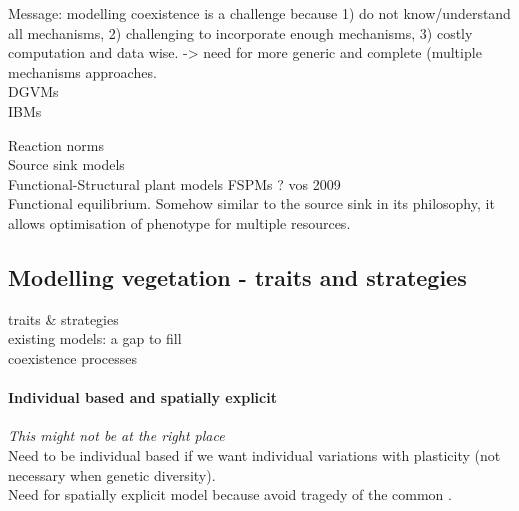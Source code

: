 Message: modelling coexistence is a challenge because 1) do not know/understand all mechanisms, 2) challenging to incorporate enough mechanisms, 3) costly computation and data wise. -> need for more generic and complete (multiple mechanisms approaches.\\

DGVMs\\
IBMs

Reaction norms\\
Source sink models\\
Functional-Structural plant models FSPMs ? vos 2009\\
Functional equilibrium. Somehow similar to the source sink in its philosophy, it allows optimisation of phenotype for multiple resources. \\


\subsection{Modelling vegetation - traits and strategies}
traits \& strategies\\
existing models: a gap to fill\\
coexistence processes


\paragraph{Individual based and spatially explicit}
\textit{This might not be at the right place}\\
Need to be individual based if we want individual variations with plasticity (not necessary when genetic diversity). \\
Need for spatially explicit model because avoid tragedy of the common \cite{farrior_competitive_2014}.

